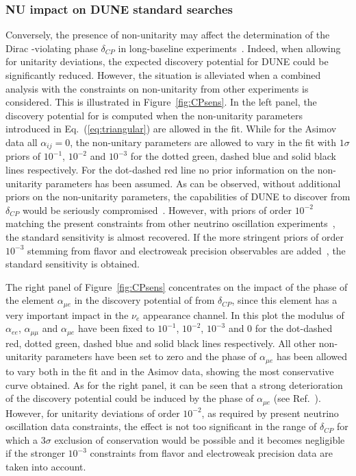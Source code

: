 \subsubsection{NU impact on DUNE standard searches}
Conversely, the presence of non-unitarity may affect the determination of the
Dirac -violating phase $\delta_{CP}$ in long-baseline experiments~\cite{Miranda:2016wdr,Fernandez-Martinez:2016lgt,Escrihuela:2016ube}.
 Indeed, when allowing for unitarity deviations, the expected  discovery potential for DUNE could be significantly reduced.
However, the situation is alleviated when a combined analysis with the constraints on non-unitarity from other experiments is considered. This is illustrated in Figure~\ref{fig:CPsens}. In the left panel, the discovery potential for  is computed when the non-unitarity parameters introduced in Eq.~(\ref{eq:triangular}) are allowed in the fit. While for the Asimov data all $\alpha_{ij}=0$, the non-unitary parameters are allowed to vary in the fit with $1 \sigma$ priors of $10^{-1}$, $10^{-2}$ and $10^{-3}$ for the dotted green, dashed blue and solid black lines respectively. For the dot-dashed red line no prior information on the non-unitarity parameters has been assumed. As can be observed, without additional priors on the non-unitarity parameters, the capabilities of DUNE to discover  from $\delta_{CP}$ would be seriously compromised~\cite{Escrihuela:2016ube}. However, with priors of order $10^{-2}$ matching the present constraints from other neutrino oscillation experiments~\cite{Escrihuela:2016ube,Blennow:2016jkn}, the standard sensitivity is almost recovered. If the more stringent priors of order $10^{-3}$ stemming from flavor and electroweak precision observables are added~\cite{Antusch:2014woa,Fernandez-Martinez:2016lgt}, the standard sensitivity is obtained.   

The right panel of Figure~\ref{fig:CPsens} concentrates on the impact of the phase of the element $\alpha_{\mu e}$ in the discovery potential of  from $\delta_{CP}$, since this element has a very important impact in the $\nu_e$ appearance channel. In this plot the modulus of $\alpha_{ee}$, $\alpha_{\mu \mu}$ and $\alpha_{\mu e}$ have been fixed to $10^{-1}$, $10^{-2}$, $10^{-3}$ and 0 for the dot-dashed red, dotted green, dashed blue and solid black lines respectively. All other non-unitarity parameters have been set to zero and the phase of $\alpha_{\mu e}$ has been allowed to vary both in the fit and in the Asimov data, showing the most conservative curve obtained. As for the right panel, it can be seen that a strong deterioration of the  discovery potential could be induced by the phase of $\alpha_{\mu e}$ (see Ref.~\cite{Escrihuela:2016ube}). However, for unitarity deviations of order $10^{-2}$, as required by present neutrino oscillation data constraints, the effect is not too significant in the range of $\delta_{CP}$ for which a $3 \sigma$ exclusion of  conservation would be possible and it becomes negligible if the stronger $10^{-3}$ constraints from flavor and electroweak precision data are taken into account.  

